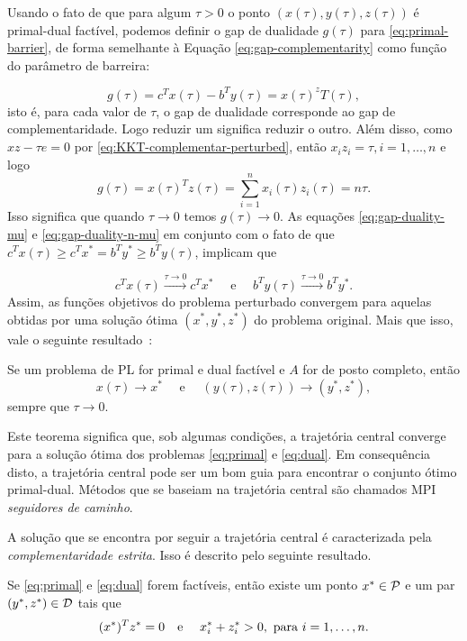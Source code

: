 Usando o fato de que para algum $\tau>0$ o ponto $(x(\tau),y(\tau),z(\tau))$ é
primal-dual factível, podemos definir o gap de dualidade $g(\tau)$ para \eqref{eq:primal-barrier},
de forma semelhante à Equação \eqref{eq:gap-complementarity} como função do
parâmetro de barreira:

\begin{equation}
\label{eq:gap-duality-mu}
g(\tau) = c^Tx(\tau) - b^Ty(\tau) =
x(\tau)^zT(\tau),
\end{equation}
isto é, para cada valor de $\tau$, o gap de dualidade corresponde ao gap de
complementaridade. Logo reduzir um significa reduzir o outro. Além disso, como
$xz - \tau e = 0$ por \eqref{eq:KKT-complementar-perturbed}, então $x_iz_i =
\tau, i=1,\dotsc,n$ e logo
 \begin{equation}
\label{eq:gap-duality-n-mu}
g(\tau) = x(\tau)^Tz(\tau)= \sum_{i=1}^nx_i(\tau)z_i(\tau) = n\tau.
\end{equation}
Isso significa que quando $\tau\to 0$ temos $g(\tau) \to 0$. As equações
\eqref{eq:gap-duality-mu} e \eqref{eq:gap-duality-n-mu} em conjunto com o fato
de que $c^T x (\tau) \geq c^Tx^* = b^T y^* \geq b^Ty(\tau)$, implicam que

 \[ c^Tx(\tau) \xrightarrow{\tau \to 0} c^Tx^* \quad \text{ e } \quad b^Ty(\tau)
 \xrightarrow{\tau \to 0} b^Ty^*.
\] Assim, as funções objetivos do problema perturbado convergem para aquelas
obtidas por uma solução ótima $(x^*,y^*,z^*)$ do problema original. Mais que isso, vale
o seguinte resultado~\cite{Meggido:Pathways-to-the-optimal:1988u}:
 
 
 \begin{teo}\label{teo:xmu-to-xstar}
 Se um problema de \ac{PL} for primal e dual factível e 
 $A$ for de posto completo, então
  \[
 x(\tau) \to x^* \quad \text{ e } \quad 
 (y(\tau),z(\tau))  \to (y^*,z^*),
\]
sempre que   $\tau\to0$.
 \end{teo}
 
 Este teorema significa que, sob algumas condições, a trajetória central
 converge para a solução ótima dos problemas \eqref{eq:primal} e
 \eqref{eq:dual}. Em consequência disto, a trajetória central  pode ser um bom
 guia para encontrar o conjunto ótimo primal-dual. Métodos que se baseiam na
 trajetória central são chamados \acl{MPI}
\emph{seguidores de caminho}.
 


A solução que se encontra por seguir a trajetória central é caracterizada pela
\emph{complementaridade estrita}. Isso é descrito pelo seguinte resultado.
\begin{teo}\label{thm:strict_complementarity}
Se \eqref{eq:primal} e \eqref{eq:dual} forem factíveis, então existe um ponto
$x^*\in\mathcal{P}$ e um par $(y^*,z^*)\in\mathcal{D}$ tais que 
\[
(x^*)^Tz^* = 0 \text{\quad e \quad} x^*_i+ z^*_i >0, \text{ para }i=1,\ldots,n.
\]
\end{teo}

